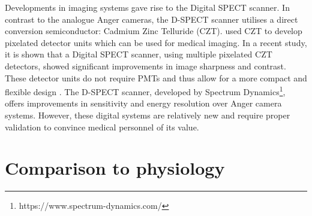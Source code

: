 Developments in imaging systems gave rise to the Digital SPECT scanner. In contrast to the analogue Anger cameras, the D-SPECT scanner utilises a direct conversion semiconductor: Cadmium Zinc Telluride (CZT). \cite{wagenaar2004cdte} used CZT to develop pixelated detector units which can be used for medical imaging. In a recent study, it is shown that a Digital SPECT scanner, using multiple pixelated CZT detectors, showed significant improvements in image sharpness and contrast\citep{goshen2018feasibility}. These detector units do not require PMTs and thus allow for a more compact and flexible design \citep{erlandsson2009performance}. The D-SPECT scanner, developed by Spectrum Dynamics\footnote{https://www.spectrum-dynamics.com/}, offers improvements in sensitivity and energy resolution \citep{SpectDynam2018} over Anger camera systems. However, these digital systems are relatively new and require proper validation to convince medical personnel of its value.

\section{Comparison to physiology}